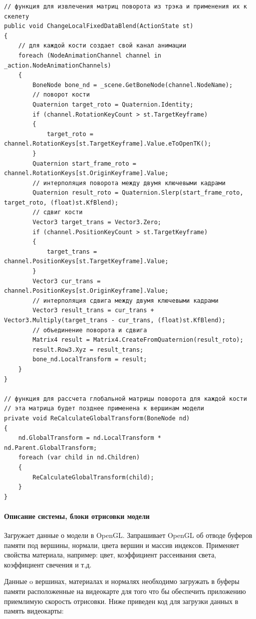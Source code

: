 \begin{verbatim}
// функция для извлечения матриц поворота из трэка и применения их к скелету
public void ChangeLocalFixedDataBlend(ActionState st)
{
    // для каждой кости создает свой канал анимации    
    foreach (NodeAnimationChannel channel in _action.NodeAnimationChannels)
    {
        BoneNode bone_nd = _scene.GetBoneNode(channel.NodeName);
        // поворот кости
        Quaternion target_roto = Quaternion.Identity;
        if (channel.RotationKeyCount > st.TargetKeyframe)
        {
            target_roto = channel.RotationKeys[st.TargetKeyframe].Value.eToOpenTK();
        }
        Quaternion start_frame_roto = channel.RotationKeys[st.OriginKeyframe].Value;
        // интерполяция поворота между двумя ключевыми кадрами
        Quaternion result_roto = Quaternion.Slerp(start_frame_roto, target_roto, (float)st.KfBlend);
        // сдвиг кости
        Vector3 target_trans = Vector3.Zero;
        if (channel.PositionKeyCount > st.TargetKeyframe)
        {
            target_trans = channel.PositionKeys[st.TargetKeyframe].Value;
        }
        Vector3 cur_trans = channel.PositionKeys[st.OriginKeyframe].Value;
        // интерполяция сдвига между двумя ключевыми кадрами
        Vector3 result_trans = cur_trans + Vector3.Multiply(target_trans - cur_trans, (float)st.KfBlend);
        // объединение поворота и сдвига
        Matrix4 result = Matrix4.CreateFromQuaternion(result_roto);
        result.Row3.Xyz = result_trans;
        bone_nd.LocalTransform = result;
    }
}

// функция для рассчета глобальной матрицы поворота для каждой кости
// эта матрица будет позднее применена к вершинам модели
private void ReCalculateGlobalTransform(BoneNode nd)
{
    nd.GlobalTransform = nd.LocalTransform * nd.Parent.GlobalTransform;
    foreach (var child in nd.Children)
    {
        ReCalculateGlobalTransform(child);
    }
}
\end{verbatim}



\paragraph{Описание системы, блоки отрисовки модели}
Загружает данные о модели в OpenGL.
Запрашивает OpenGL об отводе буферов памяти под вершины, нормали, цвета вершин и массив индексов. Применяет свойства материала, например: цвет, коэффициент рассеивания света, коэффициент свечения и т.д.

Данные o вершинах, материалах и нормалях необходимо загружать в буферы памяти расположенные на видеокарте для того что бы обеспечить приложению приемлимую скорость отрисовки.
Ниже приведен код для загрузки данных в память видеокарты:


